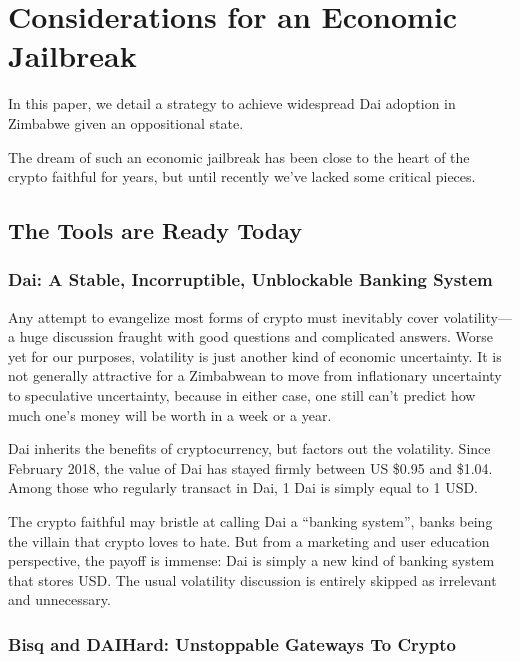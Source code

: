 \documentclass{article}
\begin{document}
\newpage
\section{Considerations for an Economic Jailbreak} \label{jailbreak}

In this paper, we detail a strategy to achieve widespread Dai adoption in Zimbabwe given an oppositional state.

The dream of such an economic jailbreak has been close to the heart of the crypto faithful for years, but until recently we've lacked some critical pieces.

\subsection{The Tools are Ready Today} \label{tools}

\subsubsection{Dai: A Stable, Incorruptible, Unblockable Banking System} \label{dai}

Any attempt to evangelize most forms of crypto must inevitably cover volatility---a huge discussion fraught with good questions and complicated answers. Worse yet for our purposes, volatility is just another kind of economic uncertainty. It is not generally attractive for a Zimbabwean to move from inflationary uncertainty to speculative uncertainty, because in either case, one still can't predict how much one's money will be worth in a week or a year.

Dai inherits the benefits of cryptocurrency, but factors out the volatility. Since February 2018, the value of Dai has stayed firmly between US \$0.95 and \$1.04. Among those who regularly transact in Dai, 1 Dai is simply equal to 1 USD.

The crypto faithful may bristle at calling Dai a ``banking system'', banks being the villain that crypto loves to hate. But from a marketing and user education perspective, the payoff is immense: Dai is simply a new kind of banking system that stores USD. The usual volatility discussion is entirely skipped as irrelevant and unnecessary.

\subsubsection{Bisq and DAIHard: Unstoppable Gateways To Crypto} \label{exchanges}
\end{document}
